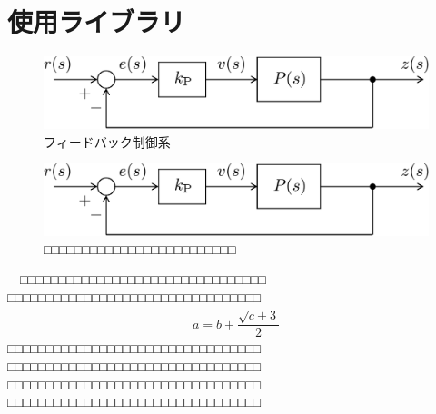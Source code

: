 \section{使用ライブラリ}
\begin{figure}[b!]
	\medskip
	\centering
	\includegraphics[scale=0.35]{fig/figure-crop.pdf}
	\caption{フィードバック制御系}
	\label{fig:feedback}
	\medskip
\end{figure}
\begin{figure}[b!]
	\medskip
	\centering
	\includegraphics[scale=0.35]{fig/figure-crop.pdf}
	\caption{□□□□□□□□□□□□□□□□□□□□□□□□□}
	\label{fig:feedback2}
	\medskip
\end{figure}
　□□□□□□□□□□□□□□□□□□□□□□□□□□□□□□□□
□□□□□□□□□□□□□□□□□□□□□□□□□□□□□□□□□
\begin{eqnarray}
	a = b + \dfrac{\sqrt{c + 3}}{2}
\end{eqnarray}
□□□□□□□□□□□□□□□□□□□□□□□□□□□□□□□□□
□□□□□□□□□□□□□□□□□□□□□□□□□□□□□□□□□
□□□□□□□□□□□□□□□□□□□□□□□□□□□□□□□□□
□□□□□□□□□□□□□□□□□□□□□□□□□□□□□□□□□



